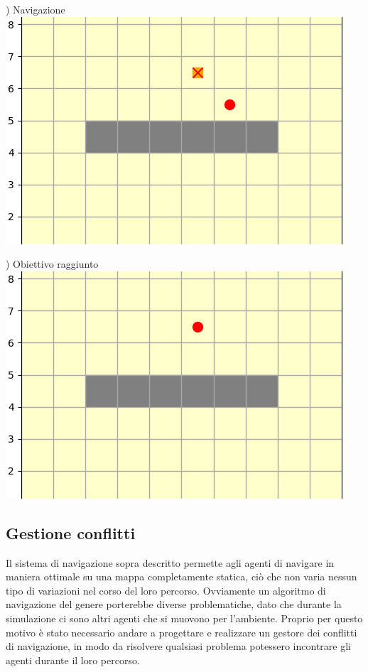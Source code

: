 \documentclass[12pt]{article}
\begin{document}
\noindent \begin{minipage}[ht]{0.45\linewidth}
) Navigazione
\includegraphics[width=\textwidth]{SimulazioniNavigazione/1AGV_Walls/4.png}
\end{minipage}
\begin{minipage}[ht]{0.45\linewidth}
) Obiettivo raggiunto
\includegraphics[width=\textwidth]{SimulazioniNavigazione/1AGV_Walls/5.png}
\end{minipage}

\newpage

\subsection{Gestione conflitti}
Il sistema di navigazione sopra descritto permette agli agenti di navigare in maniera ottimale su una mappa completamente statica, ciò che non varia nessun tipo di variazioni nel corso del loro percorso. Ovviamente un algoritmo di navigazione del genere porterebbe diverse problematiche, dato che durante la simulazione ci sono altri agenti che si muovono per l'ambiente. Proprio per questo motivo è stato necessario andare a progettare e realizzare un gestore dei conflitti di navigazione, in modo da risolvere qualsiasi problema potessero incontrare gli agenti durante il loro percorso.\\
\end{document}
